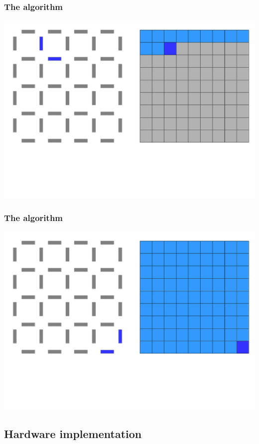 \documentclass{beamer}
\begin{document}
\begin{frame}
    \frametitle{The algorithm}
    \begin{center}
        \includegraphics[width=.8\textwidth]{img/grid4.png}
    \end{center}
\end{frame}

\begin{frame}
    \frametitle{The algorithm}
    \begin{center}
        \includegraphics[width=.8\textwidth]{img/grid8.png}
    \end{center}
\end{frame}


\subsection{Hardware implementation}%
\label{sub:hardware_imp}
\end{document}
